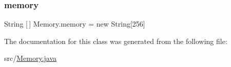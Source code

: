 \mbox{\label{class_memory_a3a84ec7ffdcb044c979085e5cc2498cb}} 
\subsubsection{\texorpdfstring{memory}{memory}}
{\footnotesize\ttfamily String \mbox{[}$\,$\mbox{]} Memory.\+memory = new String\mbox{[}256\mbox{]}\hspace{0.3cm}{\ttfamily [private]}}



The documentation for this class was generated from the following file\+:\begin{DoxyCompactItemize}
\item 
src/\mbox{\hyperlink{_memory_8java}{Memory.\+java}}\end{DoxyCompactItemize}
